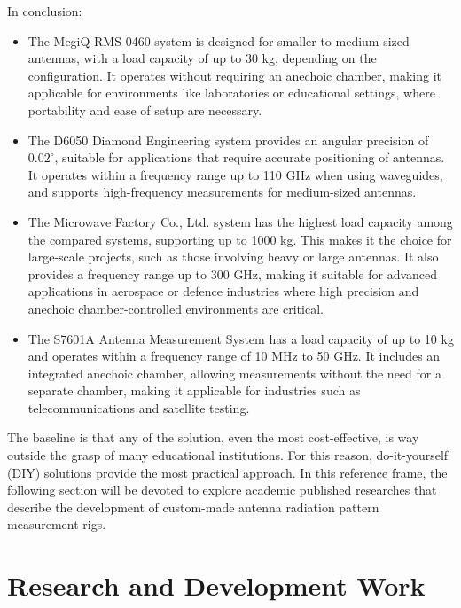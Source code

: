 In conclusion:
\begin{itemize}

\item The MegiQ RMS-0460 system is designed for smaller to medium-sized antennas, with a load capacity of up to 30 kg, depending on the configuration. It operates without requiring an anechoic chamber, making it applicable for environments like laboratories or educational settings, where portability and ease of setup are necessary.

\item The D6050 Diamond Engineering system provides an angular precision of $0.02^\circ$, suitable for applications that require accurate positioning of antennas. It operates within a frequency range up to 110 GHz when using waveguides, and supports high-frequency measurements for medium-sized antennas.

\item The Microwave Factory Co., Ltd. system has the highest load capacity among the compared systems, supporting up to 1000 kg. This makes it the choice for large-scale projects, such as those involving heavy or large antennas. It also provides a frequency range up to 300 GHz, making it suitable for advanced applications in aerospace or defence industries where high precision and anechoic chamber-controlled environments are critical.

\item The S7601A Antenna Measurement System has a load capacity of up to 10 kg and operates within a frequency range of 10 MHz to 50 GHz. It includes an integrated anechoic chamber, allowing measurements without the need for a separate chamber, making it applicable for industries such as telecommunications and satellite testing.

\end{itemize}

The baseline is that any of the solution, even the most cost-effective, is way outside the grasp of many educational institutions. For this reason, do-it-yourself (DIY) solutions provide the most practical approach. In this reference frame, the following section will be devoted to explore academic published researches that describe the development of custom-made antenna radiation pattern measurement rigs.

\section{Research and Development Work}

